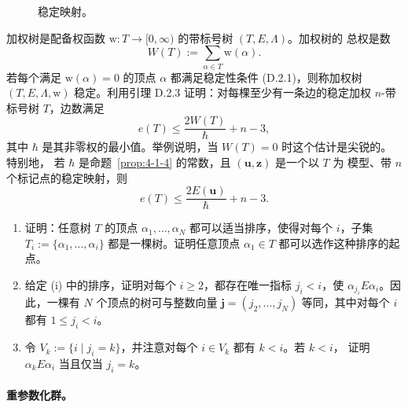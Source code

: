 \begin{figure}[htbp]
\caption{稳定映射。}\label{fig:5-1-1}
\end{figure}

\begin{exercise}\label{ex:5-1-2}
加权树是配备权函数 $\mathrm w:T\to[0,\infty)$ 的带标号树 $(T,E,\Lambda)$。加权树的
总权是数
\[
  W(T):=\sum_{\alpha\in T}\mathrm w(\alpha).
\]
若每个满足 $\mathrm w(\alpha)=0$ 的顶点 $\alpha$ 都满足稳定性条件 (D.2.1)，则称加权树
$(T,E,\Lambda,\mathrm w)$ 稳定。利用引理 D.2.3 证明：对每棵至少有一条边的稳定加权
$n$-带标号树 $T$，边数满足
\[
  e(T)\le\frac{2W(T)}{\hbar}+n-3,
\]
其中 $\hbar$ 是其非零权的最小值。举例说明，当 $W(T)=0$ 时这个估计是尖锐的。特别地，
若 $\hbar$ 是命题~\ref{prop:4-1-4} 的常数，且 $(\mathbf u,\mathbf z)$ 是一个以 $T$ 为
模型、带 $n$ 个标记点的稳定映射，则
\begin{equation}\label{eq:5-1-2}
  e(T)\le\frac{2E(\mathbf u)}{\hbar}+n-3.
\end{equation}
\end{exercise}

\begin{exercise}\label{ex:5-1-3}
\begin{enumerate}[label=(\roman*),leftmargin=3em]
\item 证明：任意树 $T$ 的顶点 $\alpha_1,\ldots,\alpha_N$ 都可以适当排序，使得对每个
$i$，子集 $T_i:=\{\alpha_1,\ldots,\alpha_i\}$ 都是一棵树。证明任意顶点
$\alpha_1\in T$ 都可以选作这种排序的起点。
\item 给定 (i) 中的排序，证明对每个 $i\ge2$，都存在唯一指标 $j_i<i$，使
$\alpha_{j_i}E\alpha_i$。因此，一棵有 $N$ 个顶点的树可与整数向量
$\mathbf j=(j_2,\ldots,j_N)$ 等同，其中对每个 $i$ 都有 $1\le j_i<i$。
\item 令 $V_k:=\{i\mid j_i=k\}$，并注意对每个 $i\in V_k$ 都有 $k<i$。若 $k<i$，
证明 $\alpha_kE\alpha_i$ 当且仅当 $j_i=k$。
\end{enumerate}
\end{exercise}

\paragraph{重参数化群。}

